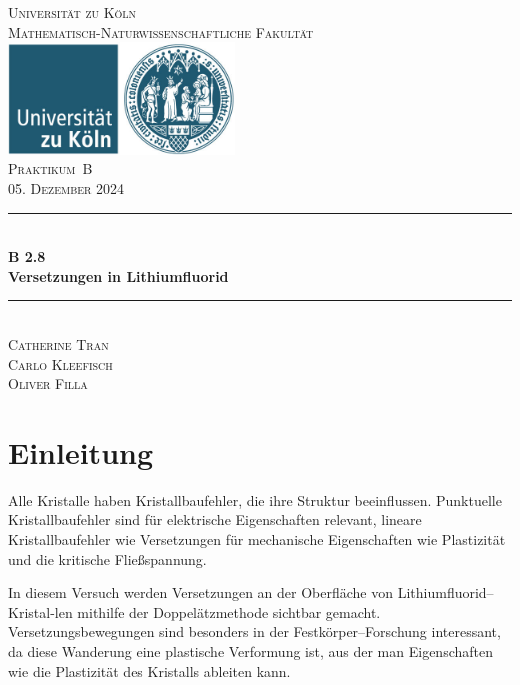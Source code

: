 \documentclass[12pt,a4paper]{scrartcl}
\numberwithin{equation}{section} %
\newcommand{\HRule}{\rule{\linewidth}{0.7mm}}
\begin{document}
\begin{titlepage}
	\pagestyle{empty}

	\begin{center}

	\textsc{\LARGE Universität zu Köln }\\ [0.4cm]
	\textsc{Mathematisch-Naturwissenschaftliche Fakultät} \\[1.5cm]

	\includegraphics[width=0.45\textwidth]{../media/uni.jpg}\\[1.5cm]  %

	\textsc{\Large Praktikum~B}\\[2mm]
	\textsc{05. Dezember 2024}\\[10mm]
	\HRule \\[0.4cm]

		{	\Huge \bfseries B 2.8}\\[0.4cm]
			{	\huge \bfseries Versetzungen in Lithiumfluorid}\\[0.3cm]
	
	\HRule \\[3cm]

		\textsc{\Large Catherine Tran } \\[3pt]
		\textsc{\Large Carlo Kleefisch } \\[3pt]
		\textsc{\Large Oliver Filla } \\[3pt]
	\end{center}
\end{titlepage}

\newpage
\tableofcontents
\newpage

\hypertarget{einleitung}{%
\section{Einleitung}\label{einleitung}}

Alle Kristalle haben Kristallbaufehler, die ihre Struktur beeinflussen. Punktuelle Kristallbaufehler sind für elektrische Eigenschaften relevant, lineare Kristallbaufehler wie Versetzungen für mechanische Eigenschaften wie Plastizität und die kritische Fließspannung.

In diesem Versuch werden Versetzungen an der Oberfläche von Lithiumfluorid--Kristal-\newline len mithilfe der Doppelätzmethode sichtbar gemacht. Versetzungsbewegungen sind besonders in der Festkörper--Forschung interessant, da diese Wanderung eine plastische Verformung ist, aus der man Eigenschaften wie die Plastizität des Kristalls ableiten kann.
\end{document}
